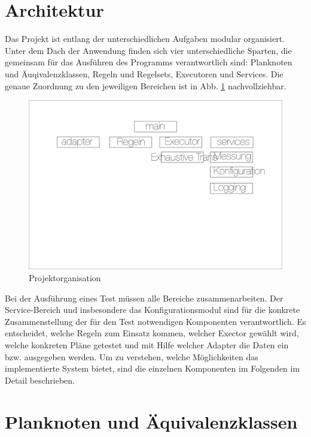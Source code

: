 \section{Architektur}


Das Projekt ist entlang der unterschiedlichen Aufgaben modular organisiert. Unter dem Dach der Anwendung finden sich vier unterschiedliche Sparten, die gemeinsam für das Ausführen des Programms verantwortlich sind: Planknoten und Äuqivalenzklassen, Regeln und Regelsets, Executoren und Services. Die genaue Zuordnung zu den jeweiligen Bereichen ist in Abb. \ref{ProjectOrga} nachvollziehbar.


\begin{figure}[h]
  \centering
  \includegraphics[width=\textwidth]{04_Implementierung/Matrix.png}
  \caption{Projektorganisation}
  \label{ProjectOrga}
\end{figure}

Bei der Ausführung eines Test müssen alle Bereiche zusammenarbeiten. Der Service-Bereich und insbesondere das Konfigurationsmodul sind für die konkrete Zusammenstellung der für den Test notwendigen Komponenten verantwortlich. Es entscheidet, welche Regeln zum Einsatz kommen, welcher Exector gewählt wird, welche konkreten Pläne getestet und mit Hilfe welcher Adapter die Daten ein bzw. ausgegeben werden. Um zu verstehen, welche Möglichkeiten das implementierte System bietet, sind die einzelnen Komponenten im Folgenden im Detail beschrieben.



\section{Planknoten und Äquivalenzklassen}





